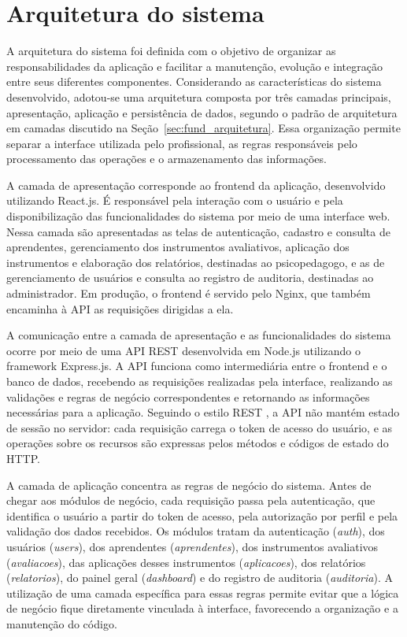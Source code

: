 \section{Arquitetura do sistema}\label{sec:arquitetura}

A arquitetura do sistema foi definida com o objetivo de organizar as responsabilidades da aplicação e facilitar a manutenção, evolução e integração entre seus diferentes componentes. Considerando as características do sistema desenvolvido, adotou-se uma arquitetura composta por três camadas principais, apresentação, aplicação e persistência de dados, segundo o padrão de arquitetura em camadas discutido na Seção~\ref{sec:fund_arquitetura}. Essa organização permite separar a interface utilizada pelo profissional, as regras responsáveis pelo processamento das operações e o armazenamento das informações.

A camada de apresentação corresponde ao frontend da aplicação, desenvolvido utilizando React.js. É responsável pela interação com o usuário e pela disponibilização das funcionalidades do sistema por meio de uma interface web. Nessa camada são apresentadas as telas de autenticação, cadastro e consulta de aprendentes, gerenciamento dos instrumentos avaliativos, aplicação dos instrumentos e elaboração dos relatórios, destinadas ao psicopedagogo, e as de gerenciamento de usuários e consulta ao registro de auditoria, destinadas ao administrador. Em produção, o frontend é servido pelo Nginx, que também encaminha à API as requisições dirigidas a ela.

A comunicação entre a camada de apresentação e as funcionalidades do sistema ocorre por meio de uma API REST desenvolvida em Node.js utilizando o framework Express.js. A API funciona como intermediária entre o frontend e o banco de dados, recebendo as requisições realizadas pela interface, realizando as validações e regras de negócio correspondentes e retornando as informações necessárias para a aplicação. Seguindo o estilo REST \cite{fielding2000_rest}, a API não mantém estado de sessão no servidor: cada requisição carrega o token de acesso do usuário, e as operações sobre os recursos são expressas pelos métodos e códigos de estado do HTTP.

A camada de aplicação concentra as regras de negócio do sistema. Antes de chegar aos módulos de negócio, cada requisição passa pela autenticação, que identifica o usuário a partir do token de acesso, pela autorização por perfil e pela validação dos dados recebidos. Os módulos tratam da autenticação (\textit{auth}), dos usuários (\textit{users}), dos aprendentes (\textit{aprendentes}), dos instrumentos avaliativos (\textit{avaliacoes}), das aplicações desses instrumentos (\textit{aplicacoes}), dos relatórios (\textit{relatorios}), do painel geral (\textit{dashboard}) e do registro de auditoria (\textit{auditoria}). A utilização de uma camada específica para essas regras permite evitar que a lógica de negócio fique diretamente vinculada à interface, favorecendo a organização e a manutenção do código.

